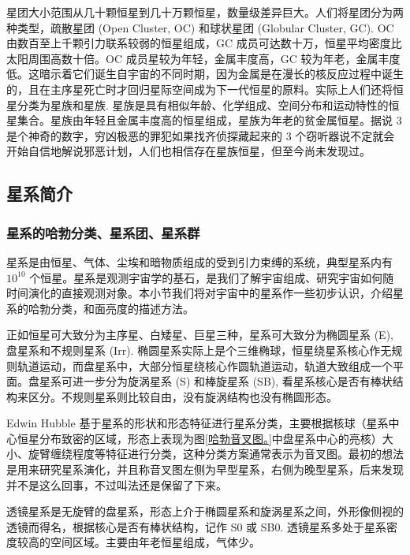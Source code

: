 \documentclass[../天体物理基础.tex]{subfiles}
\begin{document}
星团大小范围从几十颗恒星到几十万颗恒星，数量级差异巨大。人们将星团分为两种类型，疏散星团 (Open Cluster, OC) 和球状星团 (Globular Cluster, GC). OC 由数百至上千颗引力联系较弱的恒星组成，GC 成员可达数十万，恒星平均密度比太阳周围高数十倍。OC 成员星较为年轻，金属丰度高，GC 较为年老，金属丰度低。这暗示着它们诞生自宇宙的不同时期，因为金属是在漫长的核反应过程中诞生的，且在主序星死亡时才回归星际空间成为下一代恒星的原料。实际上人们还将恒星分类为星族\uppercase\expandafter{}和星族\uppercase\expandafter{}. 星族是具有相似年龄、化学组成、空间分布和运动特性的恒星集合。星族\uppercase\expandafter{}由年轻且金属丰度高的恒星组成，星族\uppercase\expandafter{}为年老的贫金属恒星。据说 3 是个神奇的数字，穷凶极恶的罪犯如果找齐侦探藏起来的 3 个窃听器说不定就会开始自信地解说邪恶计划，人们也相信存在星族\uppercase\expandafter{}恒星，但至今尚未发现过。

\subsection{星系简介}
\subsubsection{星系的哈勃分类、星系团、星系群}
星系是由恒星、气体、尘埃和暗物质组成的受到引力束缚的系统，典型星系内有 $10^{10}$ 个恒星。星系是观测宇宙学的基石，是我们了解宇宙组成、研究宇宙如何随时间演化的直接观测对象。本小节我们将对宇宙中的星系作一些初步认识，介绍星系的哈勃分类，和面亮度的描述方法。

正如恒星可大致分为主序星、白矮星、巨星三种，星系可大致分为椭圆星系 (E), 盘星系和不规则星系 (Irr). 椭圆星系实际上是个三维椭球，恒星绕星系核心作无规则轨道运动，而盘星系中，大部分恒星绕核心作圆轨道运动，轨道大致组成一个平面。盘星系可进一步分为旋涡星系 (S) 和棒旋星系 (SB), 看星系核心是否有棒状结构来区分。不规则星系则比较自由，没有旋涡结构也没有椭圆形态。

Edwin Hubble 基于星系的形状和形态特征进行星系分类，主要根据核球（星系中心恒星分布致密的区域，形态上表现为图\ref{哈勃音叉图。}中盘星系中心的亮核）大小、旋臂缠绕程度等特征进行分类，这种分类方案通常表示为音叉图。最初的想法是用来研究星系演化，并且称音叉图左侧为早型星系，右侧为晚型星系，后来发现并不是这么回事，不过叫法还是保留了下来。

透镜星系是无旋臂的盘星系，形态上介于椭圆星系和旋涡星系之间，外形像侧视的透镜而得名，根据核心是否有棒状结构，记作 S0 或 SB0. 透镜星系多处于星系密度较高的空间区域。主要由年老恒星组成，气体少。
\end{document}
